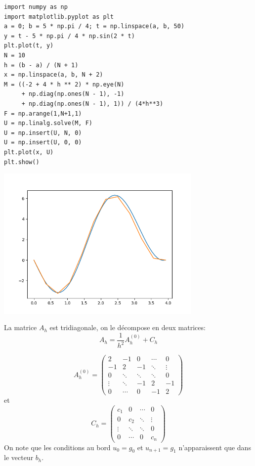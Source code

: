 \documentclass{beamer}
\begin{document}
 \begin{frame}[fragile] 
\begin{lstlisting}
import numpy as np
import matplotlib.pyplot as plt
a = 0; b = 5 * np.pi / 4; t = np.linspace(a, b, 50)
y = t - 5 * np.pi / 4 * np.sin(2 * t)
plt.plot(t, y)
N = 10
h = (b - a) / (N + 1)
x = np.linspace(a, b, N + 2)
M = ((-2 + 4 * h ** 2) * np.eye(N)
     + np.diag(np.ones(N - 1), -1)
     + np.diag(np.ones(N - 1), 1)) / (4*h**3)
F = np.arange(1,N+1,1)
U = np.linalg.solve(M, F)
U = np.insert(U, N, 0)
U = np.insert(U, 0, 0)
plt.plot(x, U)
plt.show()
\end{lstlisting}
 
 \end{frame}
 
 \begin{frame} 
  \begin{center}
\includegraphics[width=10cm]{courbe2.png}
\end{center}
 \end{frame}
 
 
\begin{frame} 
La matrice $A_h$ est tridiagonale, on le décompose en deux matrices: 
\[A_h=\frac{1}{h^2} A_h^{(0)}+C_h\]

\[A_h^{(0)}=
\left(\begin{array}{ccccc}
2&-1&0&\cdots&0\\
-1&2&-1&\ddots&\vdots\\
0&  \ddots &\ddots&\ddots&0\\
\vdots &\ddots &-1&2&-1\\
   0&\cdots &0&-1 &2
\end{array}\right)
\] 
et
\[C_h=
\left(\begin{array}{cccc}
c_1&0&\cdots&0\\
0&c_2&\ddots&\vdots\\
  \vdots &\ddots&\ddots&0\\
   0&\cdots &0&c_n
\end{array}\right)
\]
On note que  les conditions au bord $u_0 = g_0$ et $u_{n+1} = g_1 $ n'apparaissent que dans le vecteur $b_h$.

  \end{frame}
  
\end{document}
